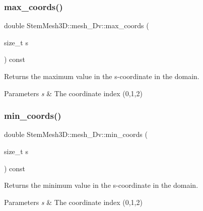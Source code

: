 \subsubsection{\texorpdfstring{max\+\_\+coords()}{max\_coords()}}
{\footnotesize\ttfamily double Stem\+Mesh3\+D\+::mesh\+\_\+Dv\+::max\+\_\+coords (\begin{DoxyParamCaption}\item[{size\+\_\+t}]{s }\end{DoxyParamCaption}) const\hspace{0.3cm}{\ttfamily [inline]}}



Returns the maximum value in the s-\/coordinate in the domain. 


\begin{DoxyParams}{Parameters}
{\em s} & The coordinate index (0,1,2) \\
\hline
\end{DoxyParams}
\mbox{\label{classStemMesh3D_1_1mesh__3Dv_a11dee62c0eab3cb5e37f81807c98c964}} 
\subsubsection{\texorpdfstring{min\+\_\+coords()}{min\_coords()}}
{\footnotesize\ttfamily double Stem\+Mesh3\+D\+::mesh\+\_\+Dv\+::min\+\_\+coords (\begin{DoxyParamCaption}\item[{size\+\_\+t}]{s }\end{DoxyParamCaption}) const\hspace{0.3cm}{\ttfamily [inline]}}



Returns the minimum value in the s-\/coordinate in the domain. 


\begin{DoxyParams}{Parameters}
{\em s} & The coordinate index (0,1,2) \\
\hline
\end{DoxyParams}
\mbox{\label{classStemMesh3D_1_1mesh__3Dv_a7655cc55bc89437d85f1a7beddbf66f4}} 
